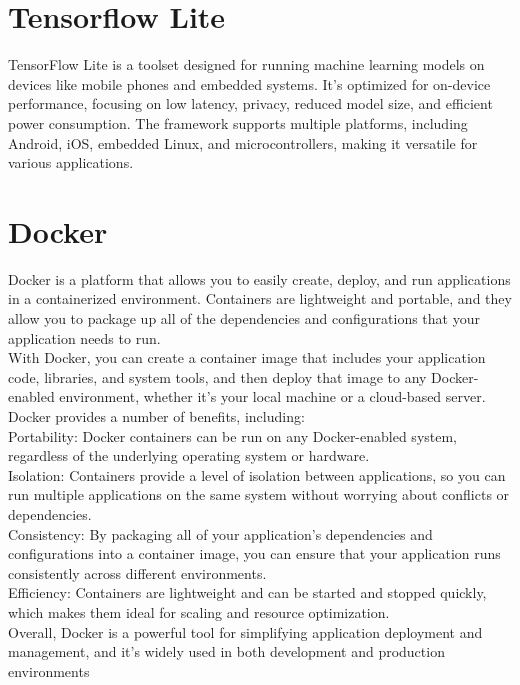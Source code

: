 \section{Tensorflow Lite}
TensorFlow Lite is a toolset designed for running machine learning models on devices like mobile phones and embedded systems. It's optimized for on-device performance, focusing on low latency, privacy, reduced model size, and efficient power consumption. The framework supports multiple platforms, including Android, iOS, embedded Linux, and microcontrollers, making it versatile for various applications. 

\section{Docker}
Docker is a platform that allows you to easily create, deploy, and run applications in a containerized environment. Containers are lightweight and portable, and they allow you to package up all of the dependencies and configurations that your application needs to run.\\

With Docker, you can create a container image that includes your application code, libraries, and system tools, and then deploy that image to any Docker-enabled environment, whether it's your local machine or a cloud-based server.\\

Docker provides a number of benefits, including:\\

Portability: Docker containers can be run on any Docker-enabled system, regardless of the underlying operating system or hardware.\\

Isolation: Containers provide a level of isolation between applications, so you can run multiple applications on the same system without worrying about conflicts or dependencies.\\

Consistency: By packaging all of your application's dependencies and configurations into a container image, you can ensure that your application runs consistently across different environments.\\

Efficiency: Containers are lightweight and can be started and stopped quickly, which makes them ideal for scaling and resource optimization.\\

Overall, Docker is a powerful tool for simplifying application deployment and management, and it's widely used in both development and production environments


